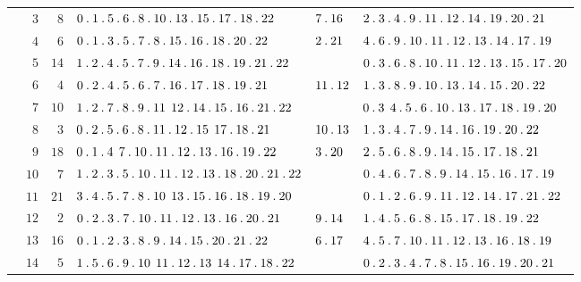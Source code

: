 \begin{longtable}{r|r|r|p{125pt}|p{28pt}|p{125pt}}
 & $3$ & $8$ & $0\pdot 1\pdot 5\pdot 6\pdot 8\pdot 10\pdot 13\pdot 15\pdot 17\pdot 18\pdot 22$ & $7\pdot 16$ & $2\pdot 3\pdot 4\pdot 9\pdot 11\pdot 12\pdot 14\pdot 19\pdot 20\pdot 21$\\
 & $4$ & $6$ & $0\pdot 1\pdot 3\pdot 5\pdot 7\pdot 8\pdot 15\pdot 16\pdot 18\pdot 20\pdot 22$ & $2\pdot 21$ & $4\pdot 6\pdot 9\pdot 10\pdot 11\pdot 12\pdot 13\pdot 14\pdot 17\pdot 19$\\
 & $5$ & $14$ & $1\pdot 2\pdot 4\pdot 5\pdot 7\pdot 9\pdot 14\pdot 16\pdot 18\pdot 19\pdot 21\pdot 22$ &  & $0\pdot 3\pdot 6\pdot 8\pdot 10\pdot 11\pdot 12\pdot 13\pdot 15\pdot 17\pdot 20$\\
 & $6$ & $4$ & $0\pdot 2\pdot 4\pdot 5\pdot 6\pdot 7\pdot 16\pdot 17\pdot 18\pdot 19\pdot 21$ & $11\pdot 12$ & $1\pdot 3\pdot 8\pdot 9\pdot 10\pdot 13\pdot 14\pdot 15\pdot 20\pdot 22$\\
 & $7$ & $10$ & $1\pdot 2\pdot 7\pdot 8\pdot 9\pdot 11\mspace{8mu}12\pdot 14\pdot 15\pdot 16\pdot 21\pdot 22$ &  & $0\pdot 3\mspace{8mu}4\pdot 5\pdot 6\pdot 10\pdot 13\pdot 17\pdot 18\pdot 19\pdot 20$\\
 & $8$ & $3$ & $0\pdot 2\pdot 5\pdot 6\pdot 8\pdot 11\pdot 12\pdot 15\mspace{8mu}17\pdot 18\pdot 21$ & $10\pdot 13$ & $1\pdot 3\pdot 4\pdot 7\pdot 9\pdot 14\pdot 16\pdot 19\pdot 20\pdot 22$\\
 & $9$ & $18$ & $0\pdot 1\pdot 4\mspace{8mu}7\pdot 10\pdot 11\pdot 12\pdot 13\pdot 16\pdot 19\pdot 22$ & $3\pdot 20$ & $2\pdot 5\pdot 6\pdot 8\pdot 9\pdot 14\pdot 15\pdot 17\pdot 18\pdot 21$\\
 & $10$ & $7$ & $1\pdot 2\pdot 3\pdot 5\pdot 10\pdot 11\pdot 12\pdot 13\pdot 18\pdot 20\pdot 21\pdot 22$ &  & $0\pdot 4\pdot 6\pdot 7\pdot 8\pdot 9\pdot 14\pdot 15\pdot 16\pdot 17\pdot 19$\\
 & $11$ & $21$ & $3\pdot 4\pdot 5\pdot 7\pdot 8\pdot 10\mspace{8mu}13\pdot 15\pdot 16\pdot 18\pdot 19\pdot 20$ &  & $0\pdot 1\pdot 2\pdot 6\pdot 9\pdot 11\pdot 12\pdot 14\pdot 17\pdot 21\pdot 22$\\
 & $12$ & $2$ & $0\pdot 2\pdot 3\pdot 7\pdot 10\pdot 11\pdot 12\pdot 13\pdot 16\pdot 20\pdot 21$ & $9\pdot 14$ & $1\pdot 4\pdot 5\pdot 6\pdot 8\pdot 15\pdot 17\pdot 18\pdot 19\pdot 22$\\
 & $13$ & $16$ & $0\pdot 1\pdot 2\pdot 3\pdot 8\pdot 9\pdot 14\pdot 15\pdot 20\pdot 21\pdot 22$ & $6\pdot 17$ & $4\pdot 5\pdot 7\pdot 10\pdot 11\pdot 12\pdot 13\pdot 16\pdot 18\pdot 19$\\
 & $14$ & $5$ & $1\pdot 5\pdot 6\pdot 9\pdot 10\mspace{8mu}11\pdot 12\pdot 13\mspace{8mu}14\pdot 17\pdot 18\pdot 22$ &  & $0\pdot 2\pdot 3\pdot 4\pdot 7\pdot 8\pdot 15\pdot 16\pdot 19\pdot 20\pdot 21$\\

\end{longtable}
